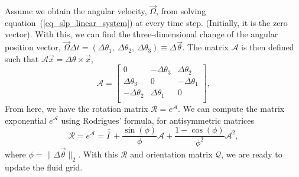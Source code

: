 Assume we obtain the angular velocity, $\vec{\Omega}$, from solving equation~(\ref{eq_slp_linear_system}) at every time step. (Initially, it is the zero vector). With this, we can find the three-dimensional change of the angular position vector, $ \vec{\Omega} \Delta t = \left( \Delta \theta_1, \ \Delta \theta_2, \ \Delta \theta_3 \right) \equiv \Delta \vec{\theta}$.
The matrix $\mathcal{A}$ is then defined such that $\mathcal{A} \vec{x} = \Delta \theta \times \vec{x}$,
\begin{equation}
	\mathcal{A}
	=\begin{bmatrix}
	 0 & - \Delta \theta_3 & \Delta \theta_2  \\
	 \Delta \theta_3 & 0  & -\Delta \theta_1  \\
	 - \Delta \theta_2 & \Delta \theta_1 & 0  \\
	\end{bmatrix},
	\label{eq_rotation_mx}
\end{equation}
From here, we have the rotation matrix $\mathcal{R} = e^{\mathcal{A}}.$
We can compute the matrix exponential $e^{\mathcal{A}}$ using Rodrigues' formula, for antisymmetric matrices
\begin{equation}
	\mathcal{R} = 
e^{\mathcal{A}} 
 = \bar{\bar{I \ }} 
 + \frac{\sin(\phi)}{\phi} \mathcal{A}
 + \frac{1-\cos(\phi)}{\phi^2} \mathcal{A}^2,
\label{eq_R_eA}
\end{equation} 
where $\phi = \|\Delta \vec{\theta}\|_2$.
With this $\mathcal{R}$ and orientation matrix $\mathcal{Q}$, we are ready to update the fluid grid.


	

